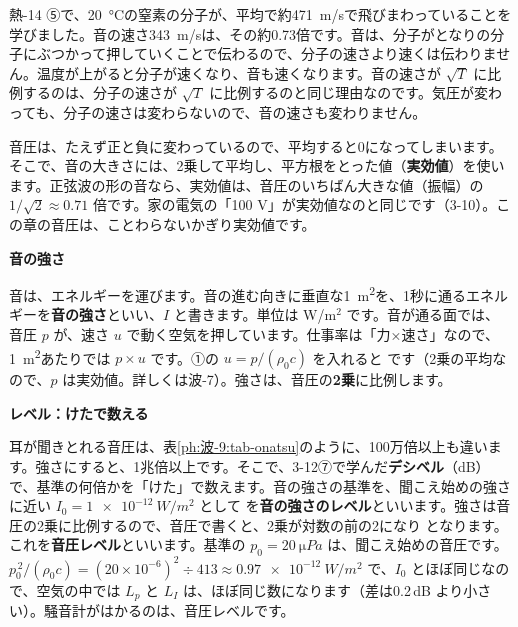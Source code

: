 \begin{motto}[3]
熱-14 ⑤で、\qty{20}{\celsius}の窒素の分子が、平均で約\qty{471}{m/s}で飛びまわっていることを学びました。音の速さ\qty{343}{m/s}は、その約0.73倍です。音は、分子がとなりの分子にぶつかって押していくことで伝わるので、分子の速さより速くは伝わりません。温度が上がると分子が速くなり、音も速くなります。音の速さが $\sqrt T$ に比例するのは、分子の速さが $\sqrt T$ に比例するのと同じ理由なのです。気圧が変わっても、分子の速さは変わらないので、音の速さも変わりません。
\end{motto}


\leavevmode\label{ph:波-9:sec6}音圧は、たえず正と負に変わっているので、平均すると0になってしまいます。そこで、音の大きさには、2乗して平均し、平方根をとった値（\textbf{実効値}）を使います。正弦波の形の音なら、実効値は、音圧のいちばん大きな値（振幅）の $1/\sqrt2\approx0.71$ 倍です。家の電気の「100 V」が実効値なのと同じです（3-10）。この章の音圧は、ことわらないかぎり実効値です。

\noindent\textbf{音の強さ}\par\nobreak
音は、エネルギーを運びます。音の進む向きに垂直な\qty{1}{m^2}を、1秒に通るエネルギーを\textbf{音の強さ}といい、$I$ と書きます。単位は W/m$^2$ です。音が通る面では、音圧 $p$ が、速さ $u$ で動く空気を押しています。仕事率は「力×速さ」なので、\qty{1}{m^2}あたりでは $p\times u$ です。①の $u=p/(\rho_0c)$ を入れると
です（2乗の平均なので、$p$ は実効値。詳しくは波-7）。強さは、音圧の\textbf{2乗}に比例します。

\noindent\textbf{レベル：けたで数える}\par\nobreak
耳が聞きとれる音圧は、表\ref{ph:波-9:tab-onatsu}のように、100万倍以上も違います。強さにすると、1兆倍以上です。そこで、3-12⑦で学んだ\textbf{デシベル}（dB）で、基準の何倍かを「けた」で数えます。音の強さの基準を、聞こえ始めの強さに近い $I_0=\qty{1e-12}{W/m^2}$ として
を\textbf{音の強さのレベル}といいます。強さは音圧の2乗に比例するので、音圧で書くと、2乗が対数の前の2になり
\label{ph:波-9:Lp}となります。これを\textbf{音圧レベル}といいます。基準の $p_0=\qty{20}{\micro Pa}$ は、聞こえ始めの音圧です。$p_0^{\,2}/(\rho_0c)=(20\times10^{-6})^2\div413\approx\qty{0.97e-12}{W/m^2}$ で、$I_0$ とほぼ同じなので、空気の中では $L_p$ と $L_I$ は、ほぼ同じ数になります（差は0.2\,dB より小さい）。騒音計がはかるのは、音圧レベルです。

